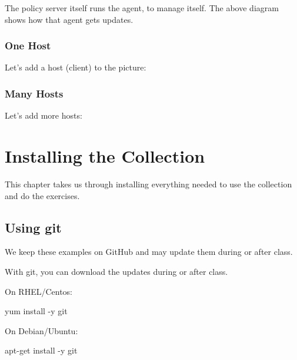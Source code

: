 
The policy server itself runs the agent, to manage itself.
The above diagram shows how that agent gets updates.





\subsubsection{One Host}

Let's add a host (client) to the picture:






\subsubsection{Many Hosts}

Let's add more hosts:






\section{Installing the Collection}

This chapter takes us through installing everything needed to use the collection
and do the exercises.





\subsection{Using git}

We keep these examples on GitHub and may update them during or after class.

With git, you can download the updates during or after class.





\begin{aside}
\label{aside:exercise_1}

On RHEL/Centos:
\begin{code}
yum install -y git
\end{code}

On Debian/Ubuntu:
\begin{code}
apt-get install -y git
\end{code}

\end{aside}





